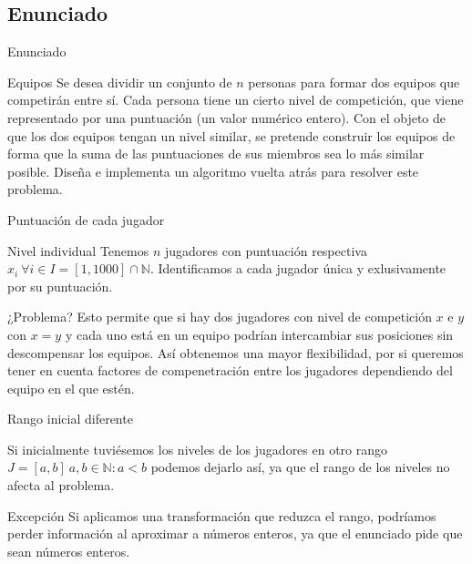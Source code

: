 \subsection{Enunciado}
\begin{frame}{Enunciado}
	\begin{block}{Equipos}
		Se desea dividir un conjunto de $n$ personas para formar dos equipos que competirán entre sí.
		Cada persona tiene un cierto nivel de competición, que viene representado por una puntuación 
		(un valor numérico entero). Con el objeto de que los dos equipos tengan un nivel similar, se
		pretende construir los equipos de forma que la suma de las puntuaciones de sus miembros sea 
		lo más similar posible. Diseña e implementa un algoritmo vuelta atrás para resolver este
		problema. 
	\end{block}
\end{frame}

\begin{frame}{Puntuación de cada jugador}
	\begin{block}{Nivel individual}
	Tenemos $n$ jugadores con puntuación respectiva $x_i\ \forall i\in I=[1, 1000]\cap \mathbb{N}$.
	Identificamos a cada jugador única y exlusivamente por su puntuación.
	\end{block}
	
	\begin{alertblock}{¿Problema?}
	Esto permite que si hay dos jugadores con nivel de competición $x$ e $y$ con $x=y$ y cada uno 
	está en un equipo podrían intercambiar sus posiciones sin descompensar los equipos.	
	Así obtenemos una mayor flexibilidad, por si queremos tener en cuenta factores de compenetración
	entre los jugadores dependiendo del equipo en el que estén.
	\end{alertblock}
\end{frame}

\begin{frame}{Rango inicial diferente}
	\begin{block}{ }
	Si inicialmente tuviésemos los niveles de los jugadores en otro rango $J=[a, b]\ a,b\in\mathbb{N}: 
	a<b$ podemos dejarlo así, ya que el rango de los niveles no afecta al problema.
	\end{block}
	
	\begin{exampleblock}{Excepción}
 	Si aplicamos una transformación que reduzca el rango, podríamos perder información al aproximar a 	
 	números	enteros, ya que el enunciado pide que sean números enteros.	
	\end{exampleblock}
\end{frame}


